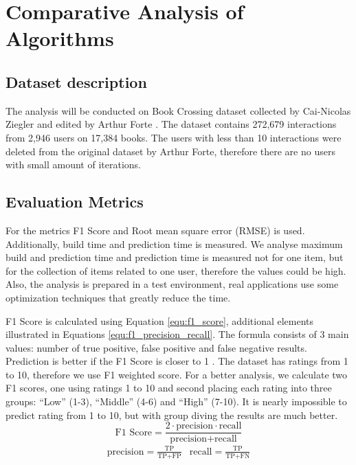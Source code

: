 \section{Comparative Analysis of Algorithms}\label{sec:dataset_analysis}

\subsection{Dataset description} %
The analysis will be conducted on Book Crossing dataset collected by Cai-Nicolas Ziegler and edited by Arthur Forte \cite{Dataset}. The dataset contains 272,679 interactions from 2,946 users on 17,384 books. The users with less than 10 interactions were deleted from the original dataset by Arthur Forte, therefore there are no users with small amount of iterations.

\subsection{Evaluation Metrics} %
For the metrics F1 Score and Root mean square error (RMSE) is used. Additionally, build time and prediction time is measured. We analyse maximum build and prediction time and prediction time is measured not for one item, but for the collection of items related to one user, therefore the values could be high. Also, the analysis is prepared in a test environment, real applications use some optimization techniques that greatly reduce the time.

F1 Score is calculated using Equation \eqref{equ:f1_score}, additional elements illustrated in Equations \eqref{equ:f1_precision_recall}. The formula consists of 3 main values: number of true positive, false positive and false negative results. Prediction is better if the F1 Score is closer to 1 \cite{F1Score}. The dataset has ratings from 1 to 10, therefore we use F1 weighted score. For a better analysis, we calculate two F1 scores, one using ratings 1 to 10 and second placing each rating into three groups: “Low” (1-3), “Middle” (4-6) and “High” (7-10). It is nearly impossible to predict rating from 1 to 10, but with group diving the results are much better.
\begin{equation}
        \text{F1 Score} = \frac{2 \cdot \text{precision} \cdot \text{recall}}{\text{precision} + \text{recall}}\label{equ:f1_score}
\end{equation}
\begin{align}
        &\text{precision} = \frac{\text{TP}}{\text{TP} + \text{FP}} &
        \text{recall} = \frac{\text{TP}}{\text{TP} + \text{FN}} &\label{equ:f1_precision_recall}
\end{align}

